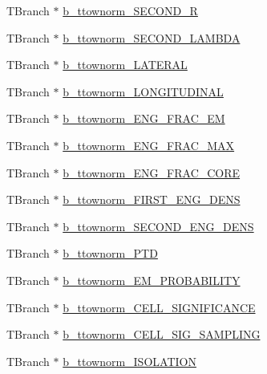 \begin{DoxyCompactItemize}
\item 
T\+Branch $\ast$ \hyperlink{classCollectionTree_a37e9489d6f52004d2cb500f60efa72e7}{b\+\_\+ttownorm\+\_\+\+S\+E\+C\+O\+N\+D\+\_\+R}
\item 
T\+Branch $\ast$ \hyperlink{classCollectionTree_ae45c85c387d3ed40d55c8c35b3ab4dca}{b\+\_\+ttownorm\+\_\+\+S\+E\+C\+O\+N\+D\+\_\+\+L\+A\+M\+B\+DA}
\item 
T\+Branch $\ast$ \hyperlink{classCollectionTree_a4026176fd9d526283e3cbcd9514cd434}{b\+\_\+ttownorm\+\_\+\+L\+A\+T\+E\+R\+AL}
\item 
T\+Branch $\ast$ \hyperlink{classCollectionTree_a12ba66b7121d58cc29ec7e9043372c0e}{b\+\_\+ttownorm\+\_\+\+L\+O\+N\+G\+I\+T\+U\+D\+I\+N\+AL}
\item 
T\+Branch $\ast$ \hyperlink{classCollectionTree_aeabc0040c3721de70d76333fa21b309a}{b\+\_\+ttownorm\+\_\+\+E\+N\+G\+\_\+\+F\+R\+A\+C\+\_\+\+EM}
\item 
T\+Branch $\ast$ \hyperlink{classCollectionTree_a90b132693202266a79ebaff08e83bbd3}{b\+\_\+ttownorm\+\_\+\+E\+N\+G\+\_\+\+F\+R\+A\+C\+\_\+\+M\+AX}
\item 
T\+Branch $\ast$ \hyperlink{classCollectionTree_a6d1ccc32115277119538cd9ea1ba09c3}{b\+\_\+ttownorm\+\_\+\+E\+N\+G\+\_\+\+F\+R\+A\+C\+\_\+\+C\+O\+RE}
\item 
T\+Branch $\ast$ \hyperlink{classCollectionTree_a97ad6fe1d5fa658f02ff01cd2dba4df4}{b\+\_\+ttownorm\+\_\+\+F\+I\+R\+S\+T\+\_\+\+E\+N\+G\+\_\+\+D\+E\+NS}
\item 
T\+Branch $\ast$ \hyperlink{classCollectionTree_a25b1dd43115ea463b0faa0a046623e84}{b\+\_\+ttownorm\+\_\+\+S\+E\+C\+O\+N\+D\+\_\+\+E\+N\+G\+\_\+\+D\+E\+NS}
\item 
T\+Branch $\ast$ \hyperlink{classCollectionTree_a279df1737ec58356030b8ab77e7fd70b}{b\+\_\+ttownorm\+\_\+\+P\+TD}
\item 
T\+Branch $\ast$ \hyperlink{classCollectionTree_adda14446c730dfc41b1f4a8e408285ba}{b\+\_\+ttownorm\+\_\+\+E\+M\+\_\+\+P\+R\+O\+B\+A\+B\+I\+L\+I\+TY}
\item 
T\+Branch $\ast$ \hyperlink{classCollectionTree_aba31b9e7a6c63208e7152b1b82f72b18}{b\+\_\+ttownorm\+\_\+\+C\+E\+L\+L\+\_\+\+S\+I\+G\+N\+I\+F\+I\+C\+A\+N\+CE}
\item 
T\+Branch $\ast$ \hyperlink{classCollectionTree_a8ad21f09bd8f1cec644a48bdeacdfd74}{b\+\_\+ttownorm\+\_\+\+C\+E\+L\+L\+\_\+\+S\+I\+G\+\_\+\+S\+A\+M\+P\+L\+I\+NG}
\item 
T\+Branch $\ast$ \hyperlink{classCollectionTree_a99140dae2c06fac339cf259a9835c411}{b\+\_\+ttownorm\+\_\+\+I\+S\+O\+L\+A\+T\+I\+ON}

\end{DoxyCompactItemize}
